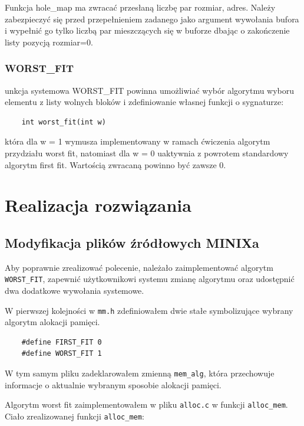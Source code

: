 \documentclass{mwrep}
\begin{document}
Funkcja hole\_{}map ma zwracać przesłaną liczbę par rozmiar, adres. Należy
zabezpieczyć się przed przepełnieniem zadanego jako argument wywołania
bufora i wypełnić go tylko liczbą par mieszczących się w buforze dbając o
zakończenie listy pozycją rozmiar=0.

\subsection{WORST\_{}FIT}
\label{TRESC::ZADANIE::WORSTFIT}
unkcja systemowa WORST\_{}FIT powinna umożliwiać wybór algorytmu wyboru
elementu z listy wolnych bloków i zdefiniowanie własnej funkcji o
sygnaturze:

\begin{lstlisting}
    int worst_fit(int w)
\end{lstlisting}

która dla w = 1 wymusza implementowany w ramach ćwiczenia algorytm przydziału
worst fit, natomiast dla w = 0 uaktywnia z powrotem standardowy algorytm first
fit. Wartością zwracaną powinno być zawsze 0.



\chapter{Realizacja rozwiązania}
\label{REALIZACJA}

\section{Modyfikacja plików źródłowych MINIXa}
\label{REALIZACJA::MODYFIKACJA}
Aby poprawnie zrealizować polecenie, należało zaimplementować algorytm 
\texttt{WORST\_{}FIT}, zapewnić użytkownikowi systemu zmianę algorytmu oraz 
udostępnić dwa dodatkowe wywołania systemowe.

W pierwszej kolejności w \texttt{mm.h} zdefiniowałem dwie stałe symbolizujące 
wybrany algorytm alokacji pamięci.

\begin{lstlisting}
    #define FIRST_FIT 0
    #define WORST_FIT 1 
\end{lstlisting}

W tym samym pliku zadeklarowałem zmienną \texttt{mem\_{}alg}, która przechowuje 
informacje o aktualnie wybranym sposobie alokacji pamięci.

Algorytm worst fit zaimplementowałem w pliku \texttt{alloc.c} w funkcji \texttt{alloc\_{}mem}.
Ciało zrealizowanej funkcji \texttt{alloc\_{}mem}:
\end{document}
